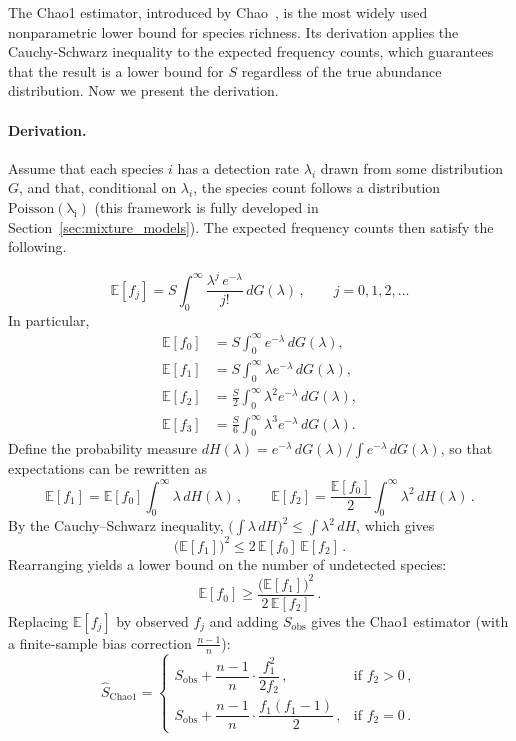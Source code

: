 ﻿\documentclass{article}
\newcommand{\E}{\mathbb{E}}
\begin{document}
The Chao1 estimator, introduced by Chao~\cite{chao1984}, is the most widely used nonparametric lower bound for species richness. Its derivation applies the Cauchy-Schwarz inequality to the expected frequency counts, which guarantees that the result is a lower bound for $S$ regardless of the true abundance distribution.
Now we present the derivation.

\paragraph{Derivation.}
Assume that each species $i$ has a detection rate $\lambda_i$ drawn from some distribution $G$, and that, conditional on $\lambda_i$, the species count follows a distribution $\mathrm{Poisson(\lambda_i)}$ (this framework is fully developed in Section~\ref{sec:mixture_models}). The expected frequency counts then satisfy the following.

\[
\E[f_j] = S \int_0^{\infty} \frac{\lambda^j\, e^{-\lambda}}{j!}\,
dG(\lambda)\,, \qquad j = 0, 1, 2, \ldots
\]
In particular,
\[
\begin{aligned}
\E[f_0] &= S \int_0^{\infty} e^{-\lambda}\, dG(\lambda), \\
\E[f_1] &= S \int_0^{\infty} \lambda e^{-\lambda}\, dG(\lambda), \\
\E[f_2] &= \frac{S}{2} \int_0^{\infty} \lambda^2 e^{-\lambda}\, dG(\lambda), \\
\E[f_3] &= \frac{S}{6} \int_0^{\infty} \lambda^3 e^{-\lambda}\, dG(\lambda).
\end{aligned}
\]
Define the probability measure
$dH(\lambda) = e^{-\lambda}\, dG(\lambda) \big/ \int e^{-\lambda}\,
dG(\lambda)$, so that expectations can be rewritten as
\[
\E[f_1] = \E[f_0] \int_0^{\infty} \lambda\, dH(\lambda)\,,
\qquad
\E[f_2] = \frac{\E[f_0]}{2} \int_0^{\infty} \lambda^2\,
dH(\lambda)\,.
\]
By the Cauchy--Schwarz inequality,
$\bigl(\int \lambda\, dH\bigr)^2 \leq \int \lambda^2\, dH$, which
gives
\[
\bigl(\E[f_1]\bigr)^2 \leq 2\,\E[f_0]\,\E[f_2]\,.
\]
Rearranging yields a lower bound on the number of undetected species:
\begin{equation}\label{eq:chao1_bound}
\E[f_0] \geq \frac{\bigl(\E[f_1]\bigr)^2}{2\,\E[f_2]}\,.
\end{equation}
Replacing $\E[f_j]$ by observed $f_j$ and adding $S_{\mathrm{obs}}$ gives the Chao1 estimator (with a finite-sample bias correction $\frac{n-1}{n}$):
\begin{equation}\label{eq:chao1}
    \hat{S}_{\mathrm{Chao1}} =
    \begin{cases}
        S_{\mathrm{obs}} + \dfrac{n-1}{n} \cdot
        \dfrac{f_1^2}{2 f_2}\,,
            & \text{if } f_2 > 0\,, \\[8pt]
        S_{\mathrm{obs}} + \dfrac{n-1}{n} \cdot
        \dfrac{f_1 (f_1 - 1)}{2}\,,
            & \text{if } f_2 = 0\,.
    \end{cases}
\end{equation}
\end{document}
